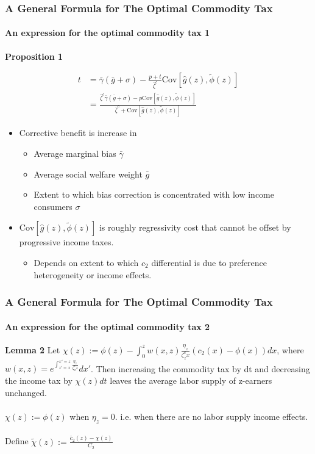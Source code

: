 \documentclass{beamer}
\newcommand{\Cov}{\mathrm{Cov}}
\begin{document}
\begin{frame}
\frametitle{A General Formula for The Optimal Commodity Tax}
\framesubtitle{An expression for the optimal commodity tax 1}

\textbf{Proposition 1} 

\begin{align}
t &= \bar{\gamma}(\bar{g} + \sigma) - \frac{p+t}{\bar{\zeta}^c} \Cov \left[\hat{g}(z), \tilde{\phi}(z) \right] \\
&= \frac{\bar{\zeta}^c \bar{\gamma} (\bar{g}  + \sigma) - p\Cov \left[ \hat{g}(z),\tilde{\phi}(z) \right]}{\bar{\zeta}^c + \Cov \left[\hat{g}(z), \tilde{\phi}(z) \right]}
\end{align}


\begin{itemize}

\item Corrective benefit is increase in 
	\begin{itemize}
	 \item Average marginal bias $\bar{\gamma}$
	 \item  Average social welfare weight $\bar{g}$
	 \item Extent to which bias correction is concentrated with low income consumers $\sigma$
	\end{itemize}
\item $\Cov \left[ \hat{g}(z), \tilde{\phi}(z) \right]$ is roughly regressivity cost that cannot be offset by progressive income taxes. 
\begin{itemize}
	\item Depends on extent to which $c_2$ differential is due to preference heterogeneity or income effects. 
\end{itemize}
\end{itemize}

\end{frame}




\begin{frame}
\frametitle{A General Formula for The Optimal Commodity Tax}
\framesubtitle{An expression for the optimal commodity tax 2}

\textbf{Lemma 2} Let $\chi(z) := \phi(z) - \int_{0}^{z} w(x,z) \frac{\eta_z}{\zeta_z^c x}(c_2(x) - \phi(x))dx$, where $w(x,z) = e^{\int_{z'=x}^{x'=z}\frac{\eta_z}{\zeta_z^c z}}dx'$. Then increasing the commodity tax by dt and decreasing the income tax by $\chi(z)dt$ leaves the average labor supply of z-earners unchanged. \\~\\ 

$\chi(z) := \phi(z)$ when $\eta_z = 0$. i.e. when there are no labor supply income effects. \\~\\ 

Define $\tilde{\chi}(z) := \frac{\bar{c}_2(z) - \chi(z)}{C_2}$
 
\end{frame}
\end{document}
